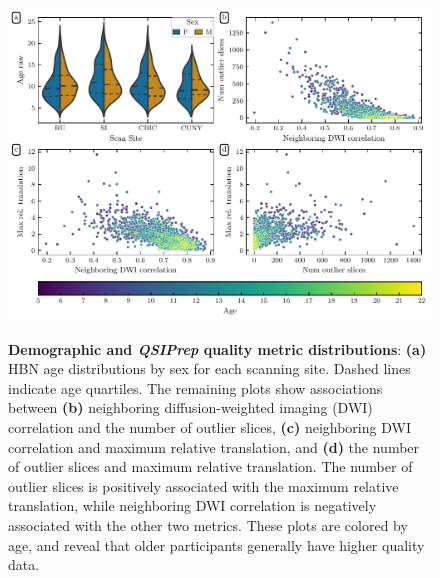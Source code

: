 \documentclass[fleqn,10pt,inline]{wlscirep}
\begin{document}
\begin{figure}[tbp]
    {\label{fig:metric-dist:age}}
    {\label{fig:metric-dist:ndc-slices}}
    {\label{fig:metric-dist:ndc-translation}}
    {\label{fig:metric-dist:slices-translation}}
    \centering
    \includegraphics[width=\linewidth]{qsiprep-metric-distributions.pdf}
    \caption{%
        {\bf Demographic and \emph{QSIPrep} quality metric distributions}:
        \textbf{(a)} HBN age distributions by sex for each scanning site. Dashed lines
        indicate age quartiles.
        The remaining plots show associations between \textbf{(b)} neighboring
        diffusion-weighted imaging (DWI) correlation  \cite{yeh2019-kb} and the
        number of outlier slices, \textbf{(c)} neighboring DWI correlation and maximum relative
        translation, and \textbf{(d)} the number of outlier slices and maximum
        relative translation.
        The number of outlier slices is positively associated with the maximum
        relative translation, while neighboring DWI correlation is negatively associated with the other
        two metrics.
        These plots are colored by age, and reveal that older participants
        generally have higher quality data.
    }
    \label{fig:metric-dist}
\end{figure}
\end{document}
